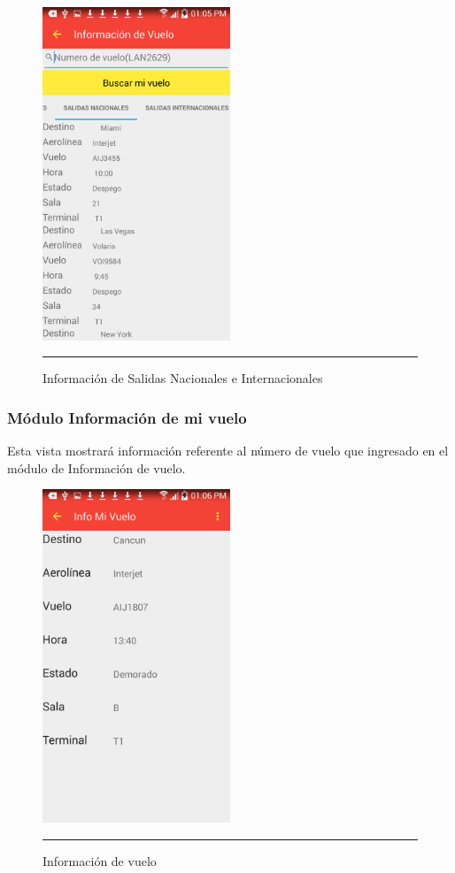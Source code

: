 \begin{figure}[h]
	\centering
		\includegraphics[width=0.5\textwidth]{Figuras/salidas.png}
		\rule{30em}{0.5pt}
	\caption[Información de Salidas Nacionales e Internacionales]{Información de Salidas Nacionales e Internacionales}
	\label{fig:infoSalidas}
\end{figure}
\clearpage

\subsubsection{Módulo Información de mi vuelo}
Esta vista mostrará información referente al número de vuelo que ingresado en el módulo de Información de vuelo.

\begin{figure}[h]
	\centering
		\includegraphics[width=0.5\textwidth]{Figuras/mivuelo.png}
		\rule{30em}{0.5pt}
	\caption[Información de vuelo]{Información de vuelo}
	\label{fig:infoVuelo}
\end{figure}
\clearpage


